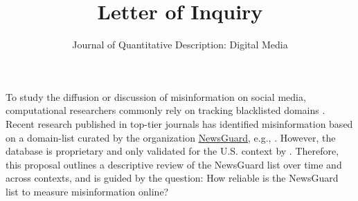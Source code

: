 \documentclass[12pt]{article}
\title{Letter of Inquiry}
\author{Journal of Quantitative Description: Digital Media}
\begin{document}
\maketitle


To study the diffusion or discussion of misinformation on social media, computational researchers commonly %
rely on tracking blacklisted domains \citep{gonzalez-bailonAsymmetricIdeologicalSegregation2023a,guessExposureUntrustworthyWebsites2020a,grinbergFakeNewsTwitter2019}. 
Recent research published in top-tier journals has identified misinformation based on a domain-list curated by the organization \href{https://www.newsguardtech.com/ratings/rating-process-criteria/}{NewsGuard}, e.g., \cite{robertsonUsersChooseEngage2023a}. However, the database is proprietary and only validated for the U.S. context by \cite{linHighLevelCorrespondence2023}. Therefore, this proposal outlines a descriptive review of the NewsGuard list over time and across contexts, and is guided by the question: How reliable is the NewsGuard list to measure misinformation online?
\end{document}
